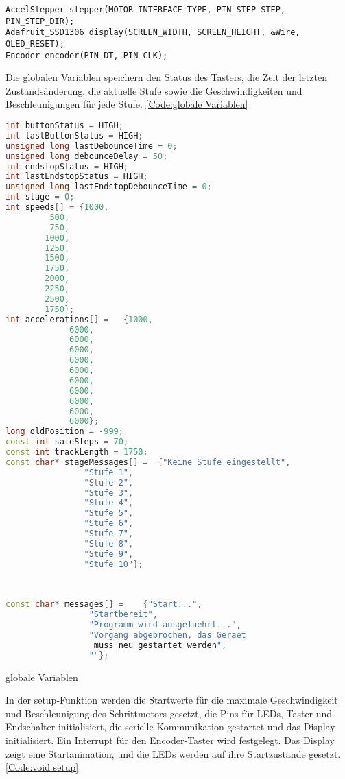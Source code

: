 \begin{lstlisting}
AccelStepper stepper(MOTOR_INTERFACE_TYPE, PIN_STEP_STEP, PIN_STEP_DIR);
Adafruit_SSD1306 display(SCREEN_WIDTH, SCREEN_HEIGHT, &Wire, OLED_RESET);
Encoder encoder(PIN_DT, PIN_CLK);
\end{lstlisting}

Die globalen Variablen speichern den Status des Tasters, die Zeit der letzten Zustandsänderung, die aktuelle Stufe sowie die Geschwindigkeiten und Beschleunigungen für jede Stufe. \ref{Code:globale Variablen}

\begin{code}
	\begin{lstlisting}[language=c++]
int buttonStatus = HIGH;
int lastButtonStatus = HIGH;
unsigned long lastDebounceTime = 0;
unsigned long debounceDelay = 50;
int endstopStatus = HIGH;
int lastEndstopStatus = HIGH;
unsigned long lastEndstopDebounceTime = 0;
int stage = 0;
int speeds[] = {1000, 
		 500,
		 750, 
		1000,
		1250, 
		1500, 
		1750, 
		2000, 
		2250, 
		2500, 
		1750};
int accelerations[] = 	{1000, 
			 6000, 
			 6000, 
			 6000, 
			 6000, 
			 6000, 
			 6000, 
			 6000, 
			 6000, 
			 6000, 
			 6000};
long oldPosition = -999;
const int safeSteps = 70;
const int trackLength = 1750;
const char* stageMessages[] =  {"Keine Stufe eingestellt", 
				"Stufe 1", 
				"Stufe 2", 
				"Stufe 3", 
				"Stufe 4", 
				"Stufe 5", 
				"Stufe 6", 
				"Stufe 7", 
				"Stufe 8", 
				"Stufe 9", 
				"Stufe 10"};
				
\end{lstlisting}        
\end{code} 				
				
\begin{code}
	\begin{lstlisting}[language=c++]	
				
const char* messages[] = 	{"Start...", 
				 "Startbereit", 
				 "Programm wird ausgefuehrt...", 
				 "Vorgang abgebrochen, das Geraet
				  muss neu gestartet werden", 
				 ""};
\end{lstlisting}      

\caption[globale Variablen]{globale Variablen}\label{Code:globale Variablen}    
\end{code} 

In der setup-Funktion werden die Startwerte für die maximale Geschwindigkeit und Beschleunigung des Schrittmotors gesetzt, die Pins für LEDs, Taster und Endschalter initialisiert, die serielle Kommunikation gestartet und das Display initialisiert. Ein Interrupt für den Encoder-Taster wird festgelegt. Das Display zeigt eine Startanimation, und die LEDs werden auf ihre Startzustände gesetzt. \ref{Code:void setup}

